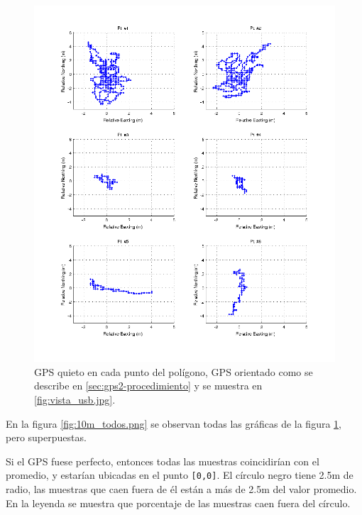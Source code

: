 \documentclass[spanish,12pt,a4paper,titlepage]{report}
\begin{document}
\begin{figure}[h!]
  \includegraphics[width=1.1\textwidth]{./img/10min_grid.png}
  \caption{GPS quieto en cada punto del polígono, GPS orientado como se describe en \ref{sec:gps2-procedimiento} y se muestra en \ref{fig:vista_usb.jpg}.}
  \label{fig:10min_grid.png}
\end{figure}

\newpage
En la figura \ref{fig:10m_todos.png} se observan todas las gráficas de la figura \ref{fig:10min_grid.png}, pero superpuestas.

Si el GPS fuese perfecto, entonces todas las muestras coincidirían con el promedio, y estarían ubicadas en el punto \verb+[0,0]+. El círculo negro tiene 2.5m de radio, las muestras que caen fuera de él están a más de 2.5m del valor promedio. En la leyenda se muestra que porcentaje de las muestras caen fuera del círculo.
\end{document}
